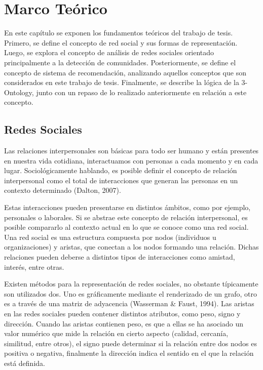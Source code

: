 \renewcommand{\thefigure}{\thechapter-\arabic{figure}}

\chapter{Marco Teórico}

\label{cap:marcoteorico}

En este capítulo se exponen los fundamentos teóricos del trabajo de tesis. Primero, se define el concepto de red social y sus formas de representación. Luego, se explora el concepto de análisis de redes sociales orientado principalmente a la detección de comunidades. Posteriormente, se define el concepto de sistema de recomendación, analizando aquellos conceptos que son considerados en este trabajo de tesis. Finalmente, se describe la lógica de la 3-Ontology, junto con un repaso de lo realizado anteriormente en relación a este concepto.

\section{Redes Sociales}

Las relaciones interpersonales son básicas para todo ser humano y están presentes en nuestra vida cotidiana, interactuamos con personas a cada momento y en cada lugar. Sociológicamente hablando, es posible definir el concepto de relación interpersonal como el total de interacciones que generan las personas en un contexto determinado (Dalton, 2007).

Estas interacciones pueden presentarse en distintos ámbitos, como por ejemplo, personales o laborales. Si se abstrae este concepto de relación interpersonal, es posible compararlo al contexto actual en lo que se conoce como una red social. Una red social es una estructura compuesta por nodos (individuos u organizaciones) y aristas, que conectan a los nodos formando una relación. Dichas relaciones pueden deberse a distintos tipos de interacciones como amistad, interés, entre otras.

Existen métodos para la representación de redes sociales, no obstante típicamente son utilizados dos. Uno es gráficamente mediante el renderizado de un grafo, otro es a través de una matriz de adyacencia (Wasserman & Faust, 1994). Las aristas en las redes sociales pueden contener distintos atributos, como peso, signo y dirección. Cuando las aristas contienen peso, es que a ellas se ha asociado un valor numérico que mide la relación en cierto aspecto (calidad, cercanía, similitud, entre otros), el signo puede determinar si la relación entre dos nodos es positiva o negativa, finalmente la dirección indica el sentido en el que la relación está definida.

